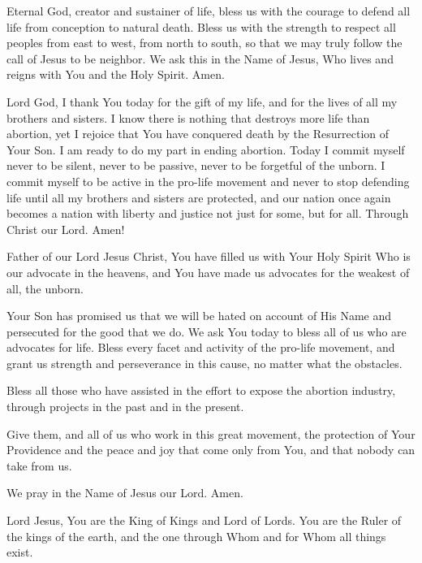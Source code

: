\label{prayer:life-dignity}
Eternal God, creator and sustainer of life, bless us with the courage to defend all life from conception to natural death.
Bless us with the strength to respect all peoples from east to west, from north to south,
so that we may truly follow the call of Jesus to be neighbor.
We ask this in the Name of Jesus, Who lives and reigns with You and the Holy Spirit.
Amen.

Lord God, I thank You today for the gift of my life, and for the lives of all my brothers and sisters.
I know there is nothing that destroys more life than abortion, yet I rejoice that You have conquered death by the Resurrection of Your Son. 
I am ready to do my part in ending abortion. Today I commit myself 
never to be silent, 
never to be passive, 
never to be forgetful of the unborn. 
I commit myself to be active in the pro-life movement and never to stop defending life until all my brothers and sisters are protected, and our nation once again becomes a nation with liberty and justice not just for some, but for all.
Through Christ our Lord. Amen!

Father of our Lord Jesus Christ,
You have filled us with Your Holy Spirit Who is our advocate in the heavens, and You have made us advocates for the weakest of all, the unborn.

Your Son has promised us that we will be hated on account of His Name and persecuted for the good that we do.
We ask You today to bless all of us who are advocates for life.
Bless every facet and activity of the pro-life movement, and grant us strength and perseverance in this cause, no matter what the obstacles.

Bless all those who have assisted in the effort to expose the abortion industry, through projects in the past and in the present.

Give them, and all of us who work in this great movement, the protection of Your Providence and the peace and joy that come only from You, and that nobody can take from us.

We pray in the Name of Jesus our Lord. Amen.

Lord Jesus,
You are the King of Kings and Lord of Lords.
You are the Ruler of the kings of the earth, and the one through Whom and for Whom all things exist.

